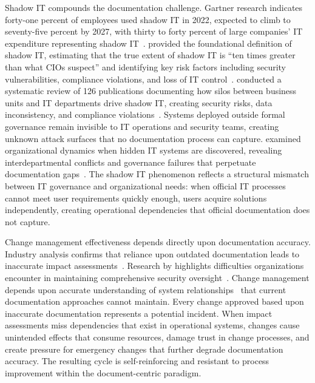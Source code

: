 Shadow IT compounds the documentation challenge. Gartner research indicates forty-one percent of employees used shadow IT in 2022, expected to climb to seventy-five percent by 2027, with thirty to forty percent of large companies' IT expenditure representing shadow IT~\parencite{Gartner_Shadow_IT_2022}. \citeauthor{Haag_Eckhardt_2017} provided the foundational definition of shadow IT, estimating that the true extent of shadow IT is ``ten times greater than what CIOs suspect'' and identifying key risk factors including security vulnerabilities, compliance violations, and loss of IT control~\parencite{Haag_Eckhardt_2017}. \citeauthor{Klotz_2019} conducted a systematic review of 126 publications documenting how silos between business units and IT departments drive shadow IT, creating security risks, data inconsistency, and compliance violations~\parencite{Klotz_2019}. Systems deployed outside formal governance remain invisible to IT operations and security teams, creating unknown attack surfaces that no documentation process can capture. \citeauthor{Furstenau_2021} examined organizational dynamics when hidden IT systems are discovered, revealing interdepartmental conflicts and governance failures that perpetuate documentation gaps~\parencite{Furstenau_2021}. The shadow IT phenomenon reflects a structural mismatch between IT governance and organizational needs: when official IT processes cannot meet user requirements quickly enough, users acquire solutions independently, creating operational dependencies that official documentation does not capture.

Change management effectiveness depends directly upon documentation accuracy. Industry analysis confirms that reliance upon outdated documentation leads to inaccurate impact assessments~\parencite{Freshservice_Change_2021}. Research by \citeauthor{Bokan_Santos_2021} highlights difficulties organizations encounter in maintaining comprehensive security oversight~\parencite{Bokan_Santos_2021}. Change management depends upon accurate understanding of system relationships~\parencite{iso20000_2018} that current documentation approaches cannot maintain. Every change approved based upon inaccurate documentation represents a potential incident. When impact assessments miss dependencies that exist in operational systems, changes cause unintended effects that consume resources, damage trust in change processes, and create pressure for emergency changes that further degrade documentation accuracy. The resulting cycle is self-reinforcing and resistant to process improvement within the document-centric paradigm.


